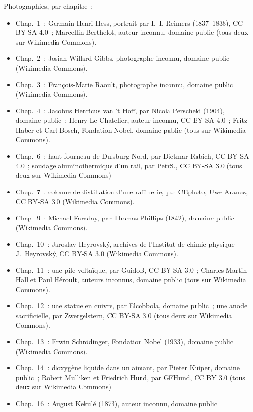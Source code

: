 \bigskip
\noindent Photographies, par chapitre~:
\begin{itemize}\small
  \item Chap.~1~: Germain Henri Hess, portrait par I.~I. Reimers
        (1837--1838), CC BY-SA 4.0~; Marcellin Berthelot, auteur inconnu,
        domaine public (tous deux sur Wikimedia Commons).
  \item Chap.~2~: Josiah Willard Gibbs, photographe inconnu, domaine
        public (Wikimedia Commons).
  \item Chap.~3~: François-Marie Raoult, photographe inconnu, domaine
        public (Wikimedia Commons).
  \item Chap.~4~: Jacobus Henricus van 't Hoff, par Nicola Perscheid
        (1904), domaine public~; Henry Le Chatelier, auteur inconnu,
        CC BY-SA 4.0~; Fritz Haber et Carl Bosch, Fondation Nobel,
        domaine public (tous sur Wikimedia Commons).
  \item Chap.~6~: haut fourneau de Duisburg-Nord, par Dietmar Rabich,
        CC BY-SA 4.0~; soudage aluminothermique d'un rail, par PetrS.,
        CC BY-SA 3.0 (tous deux sur Wikimedia Commons).
  \item Chap.~7~: colonne de distillation d'une raffinerie, par CEphoto,
        Uwe Aranas, CC BY-SA 3.0 (Wikimedia Commons).
  \item Chap.~9~: Michael Faraday, par Thomas Phillips (1842), domaine
        public (Wikimedia Commons).
  \item Chap.~10~: Jaroslav Heyrovský, archives de l'Institut de chimie
        physique J.~Heyrovský, CC BY-SA 3.0 (Wikimedia Commons).
  \item Chap.~11~: une pile voltaïque, par GuidoB, CC BY-SA 3.0~;
        Charles Martin Hall et Paul Héroult, auteurs inconnus, domaine
        public (tous sur Wikimedia Commons).
  \item Chap.~12~: une statue en cuivre, par Elcobbola, domaine public~;
        une anode sacrificielle, par Zwergelstern, CC BY-SA 3.0 (tous deux
        sur Wikimedia Commons).
  \item Chap.~13~: Erwin Schrödinger, Fondation Nobel (1933), domaine
        public (Wikimedia Commons).
  \item Chap.~14~: dioxygène liquide dans un aimant, par Pieter Kuiper,
        domaine public~; Robert Mulliken et Friedrich Hund, par GFHund,
        CC BY 3.0 (tous deux sur Wikimedia Commons).
  \item Chap.~16~: August Kekulé (1873), auteur inconnu, domaine public

\end{itemize}
